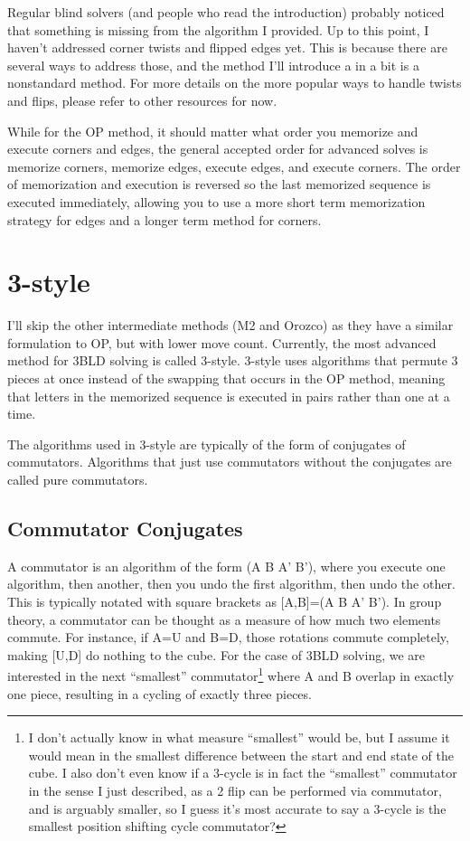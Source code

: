 \documentclass{article}
\begin{document}
Regular blind solvers (and people who read the introduction) probably noticed that something is missing from the algorithm I provided. Up to this point, I haven't addressed corner twists and flipped edges yet. This is because there are several ways to address those, and the method I'll introduce a in a bit is a nonstandard method. For more details on the more popular ways to handle twists and flips, please refer to other resources for now.

While for the OP method, it should matter what order you memorize and execute corners and edges, the general accepted order for advanced solves is memorize corners, memorize edges, execute edges, and execute corners. The order of memorization and execution is reversed so the last memorized sequence is executed immediately, allowing you to use a more short term memorization strategy for edges and a longer term method for corners.

\section{3-style}
I'll skip the other intermediate methods (M2 and Orozco) as they have a similar formulation to OP, but with lower move count. Currently, the most advanced method for 3BLD solving is called 3-style. 3-style uses algorithms that permute 3 pieces at once instead of the swapping that occurs in the OP method, meaning that letters in the memorized sequence is executed in pairs rather than one at a time.

The algorithms used in 3-style are typically of the form of conjugates of commutators. Algorithms that just use commutators without the conjugates are called pure commutators.

\subsection{Commutator Conjugates}
A commutator is an algorithm of the form (A B A' B'), where you execute one algorithm, then another, then you undo the first algorithm, then undo the other. This is typically notated with square brackets as [A,B]=(A B A' B'). In group theory, a commutator can be thought as a measure of how much two elements commute. For instance, if A=U and B=D, those rotations commute completely, making [U,D] do nothing to the cube. For the case of 3BLD solving, we are interested in the next ``smallest'' commutator\footnote{I don't actually know in what measure ``smallest'' would be, but I assume it would mean in the smallest difference between the start and end state of the cube. I also don't even know if a 3-cycle is in fact the ``smallest'' commutator in the sense I just described, as a 2 flip can be performed via commutator, and is arguably smaller, so I guess it's most accurate to say a 3-cycle is the smallest position shifting cycle commutator?} where A and B overlap in exactly one piece, resulting in a cycling of exactly three pieces.
\end{document}
